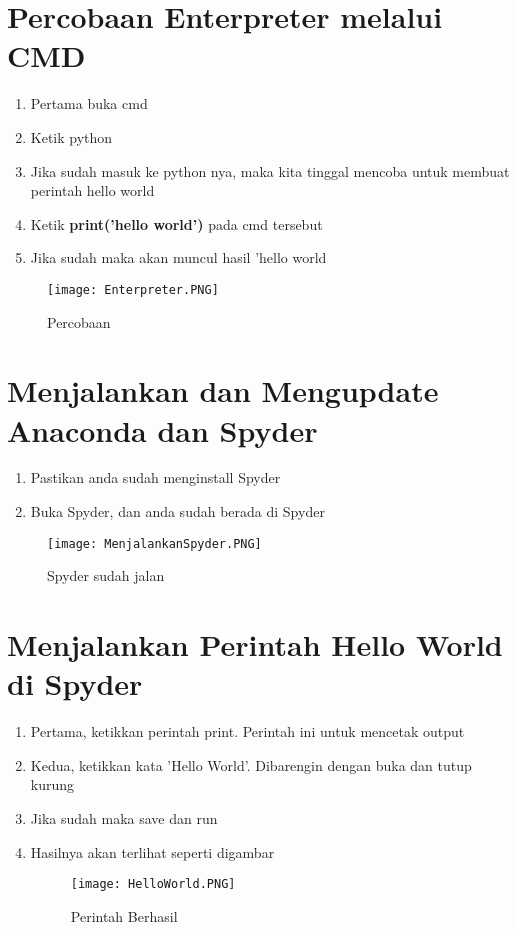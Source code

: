 \documentclass{article}
\begin{document}
\section{Percobaan Enterpreter melalui CMD}
\begin{enumerate}
    \item Pertama buka cmd
    \item Ketik python
    \item Jika sudah masuk ke python nya, maka kita tinggal mencoba untuk membuat perintah hello world
    \item Ketik \textbf{print('hello world')} pada cmd tersebut
    \item Jika sudah maka akan muncul hasil 'hello world
\end{enumerate}
\begin{figure}[!htbp]
    \centering
    \texttt{[image: Enterpreter.PNG]}
    \caption{Percobaan}
\end{figure}


\newpage
\section{Menjalankan dan Mengupdate Anaconda dan Spyder}
\begin{enumerate}
    \item Pastikan anda sudah menginstall Spyder
    \item Buka Spyder, dan anda sudah berada di Spyder
\end{enumerate}
\begin{figure}[!htbp]
    \centering
    \texttt{[image: MenjalankanSpyder.PNG]}
    \caption{Spyder sudah jalan}
\end{figure}

\newpage
\section{Menjalankan Perintah Hello World di Spyder}
\begin{enumerate}
    \item Pertama, ketikkan perintah print. Perintah ini untuk mencetak output
    \item Kedua, ketikkan kata 'Hello World'. Dibarengin dengan buka dan tutup kurung
    \item Jika sudah maka save dan run
    \item Hasilnya akan terlihat seperti digambar
\begin{figure}
    \centering
    \texttt{[image: HelloWorld.PNG]}
    \caption{Perintah Berhasil}
\end{figure}
\end{enumerate}
\end{document}
